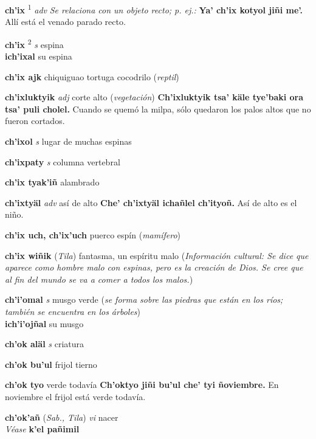\documentclass[10pt]{scrbook}
\newcommand{\entry}[1]{\textbf{#1}}
\newcommand{\defsuperscript}[1]{\textsuperscript{#1}}
\newcommand{\nontranslationdef}[1]{\textit{#1}}
\newcommand{\partofspeech}[1]{\textit{#1}}
\newcommand{\spanishtranslation}[1]{#1}
\newcommand{\clarification}[1]{(\textit{#1})}
\newcommand{\cholexample}[1]{\textbf{#1}}
\newcommand{\exampletranslation}[1]{#1}
\newcommand{\alsosee}[1]{\\\textit{Véase} \textbf{#1}}
\newcommand{\relevantdialect}[1]{(\textit{#1})}
\newcommand{\culturalinformation}[1]{(\textit{#1})}
\newcommand{\secondaryentry}[1]{\\\textbf{#1}}
\newcommand{\secondtranslation}[1]{#1}
\begin{document}
\begin{multicols}{2}
\entry{ch'ix}
\defsuperscript{1}
\partofspeech{adv}
\nontranslationdef{Se relaciona con un objeto recto; p. ej.:}
\cholexample{Ya' ch'ix kotyol jiñi me'.}
\exampletranslation{Allí está el venado parado recto.}

\entry{ch'ix}
\defsuperscript{2}
\partofspeech{s}
\spanishtranslation{espina}
\secondaryentry{ich'ixal}
\secondtranslation{su espina}

\entry{ch'ix ajk}
\spanishtranslation{chiquiguao}
\spanishtranslation{tortuga cocodrilo}
\clarification{reptil}

\entry{ch'ixluktyik}
\partofspeech{adj}
\spanishtranslation{corte alto}
\clarification{vegetación}
\cholexample{Ch'ixluktyik tsa' käle tye'baki ora tsa' puli cholel.}
\exampletranslation{Cuando se quemó la milpa, sólo quedaron los palos altos que no fueron cortados.}

\entry{ch'ixol}
\partofspeech{s}
\spanishtranslation{lugar de muchas espinas}

\entry{ch'ixpaty}
\partofspeech{s}
\spanishtranslation{columna vertebral}

\entry{ch'ix tyak'iñ}
\spanishtranslation{alambrado}

\entry{ch'ixtyäl}
\partofspeech{adv}
\spanishtranslation{así de alto}
\cholexample{Che' ch'ixtyäl ichañlel ch'ityoñ.}
\exampletranslation{Así de alto es el niño.}

\entry{ch'ix uch, ch'ix'uch}
\spanishtranslation{puerco espín}
\clarification{mamífero}

\entry{ch'ix wiñik}
\relevantdialect{Tila}
\spanishtranslation{fantasma, un espíritu malo}
\culturalinformation{Información cultural: Se dice que aparece como hombre malo con espinas, pero es la creación de Dios. Se cree que al fin del mundo se va a comer a todos los malos.}

\entry{ch'i'omal}
\partofspeech{s}
\spanishtranslation{musgo verde}
\clarification{se forma sobre las piedras que están en los ríos; también se encuentra en los árboles}
\secondaryentry{ich'i'ojñal}
\secondtranslation{su musgo}

\entry{ch'ok aläl}
\partofspeech{s}
\spanishtranslation{criatura}

\entry{ch'ok bu'ul}
\spanishtranslation{frijol tierno}

\entry{ch'ok tyo}
\spanishtranslation{verde todavía}
\cholexample{Ch'oktyo jiñi bu'ul che' tyi ñoviembre.}
\exampletranslation{En noviembre el frijol está verde todavía.}

\entry{ch'ok'añ}
\relevantdialect{Sab., Tila}
\partofspeech{vi}
\spanishtranslation{nacer}
\alsosee{k'el pañimil}


\end{multicols}
\end{document}
